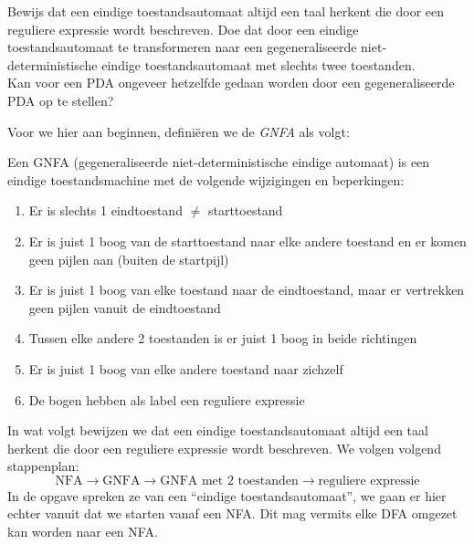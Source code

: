 \begin{question}
Bewijs dat een eindige toestandsautomaat altijd een taal herkent die door een reguliere expressie wordt beschreven. Doe dat door een eindige toestandsautomaat te transformeren naar een gegeneraliseerde niet-deterministische eindige toestandsautomaat met slechts twee toestanden.\\
Kan voor een PDA ongeveer hetzelfde gedaan worden door een gegeneraliseerde PDA op te stellen?\\
\end{question}

Voor we hier aan beginnen, defini\"eren we de \emph{GNFA} als volgt:
\begin{theorem}[GNFA]
Een GNFA (gegeneraliseerde niet-deterministische eindige automaat) is een eindige toestandsmachine met de volgende wijzigingen en beperkingen:
\begin{enumerate}
\item Er is slechts 1 eindtoestand $\neq$ starttoestand
\item Er is juist 1 boog van de starttoestand naar elke andere toestand en er komen geen pijlen aan (buiten de startpijl)
\item Er is juist 1 boog van elke toestand naar de eindtoestand, maar er vertrekken geen pijlen vanuit de eindtoestand
\item Tussen elke andere 2 toestanden is er juist 1 boog in beide richtingen
\item Er is juist 1 boog van elke andere toestand naar zichzelf
\item De bogen hebben als label een reguliere expressie
\end{enumerate}
\end{theorem}
In wat volgt bewijzen we dat een eindige toestandsautomaat altijd een taal herkent die door een reguliere expressie wordt beschreven. We volgen volgend stappenplan:
$$ \text{NFA} \rightarrow \text{GNFA} \rightarrow \text{GNFA met 2 toestanden} \rightarrow \text{reguliere expressie} $$
In de opgave spreken ze van een ``eindige toestandsautomaat'', we gaan er hier echter vanuit dat we starten vanaf een NFA. Dit mag vermits elke DFA omgezet kan worden naar een NFA.

